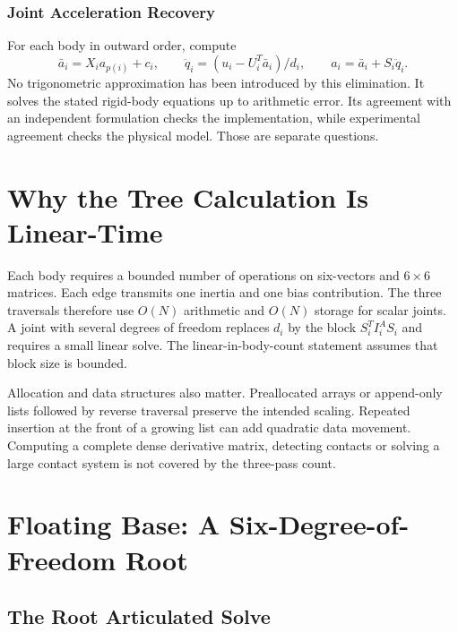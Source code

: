 \subsubsection{Joint Acceleration Recovery}
\label{subsubsec:joint_acceleration}

For each body in outward order, compute
\begin{equation}
 \bar a_i=X_i a_{p(i)}+c_i,\qquad
 \ddot q_i=(u_i-U_i^T\bar a_i)/d_i,\qquad
 a_i=\bar a_i+S_i\ddot q_i.
 \label{eq:aba_joint_acceleration}
\end{equation}
No trigonometric approximation has been introduced by this elimination. It solves the stated rigid-body equations up to arithmetic error. Its agreement with an independent formulation checks the implementation, while experimental agreement checks the physical model. Those are separate questions.

\section{Why the Tree Calculation Is Linear-Time}
\label{sec:aba_complexity}

Each body requires a bounded number of operations on six-vectors and $6\times6$ matrices. Each edge transmits one inertia and one bias contribution. The three traversals therefore use $O(N)$ arithmetic and $O(N)$ storage for scalar joints. A joint with several degrees of freedom replaces $d_i$ by the block $S_i^T I_i^A S_i$ and requires a small linear solve. The linear-in-body-count statement assumes that block size is bounded.

Allocation and data structures also matter. Preallocated arrays or append-only lists followed by reverse traversal preserve the intended scaling. Repeated insertion at the front of a growing list can add quadratic data movement. Computing a complete dense derivative matrix, detecting contacts or solving a large contact system is not covered by the three-pass count.

\section{Floating Base: A Six-Degree-of-Freedom Root}
\label{sec:floating_base}

\subsection{The Root Articulated Solve}
\label{subsec:floating_base_aba}

